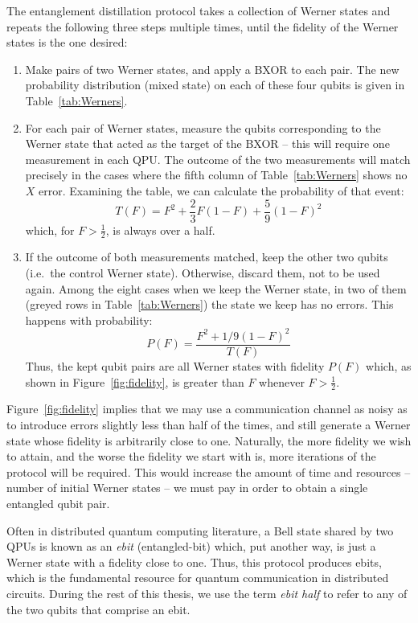 The entanglement distillation protocol takes a collection of Werner states and repeats the following three steps multiple times, until the fidelity of the Werner states is the one desired:

\begin{enumerate}
  \item Make pairs of two Werner states, and apply a BXOR to each pair. The new probability distribution (mixed state) on each of these four qubits is given in Table~\ref{tab:Werners}.

  \item For each pair of Werner states, measure the qubits corresponding to the Werner state that acted as the target of the BXOR -- this will require one measurement in each QPU. The outcome of the two measurements will match precisely in the cases where the fifth column of Table~\ref{tab:Werners} shows no \(X\) error. Examining the table, we can calculate the probability of that event: {\small \[T(F) = F^2 + \frac{2}{3} F(1-F) + \frac{5}{9} (1-F)^2\]}which, for \(F > \frac{1}{2}\), is always over a half.

  \item If the outcome of both measurements matched, keep the other two qubits (i.e.\ the control Werner state). Otherwise, discard them, not to be used again. Among the eight cases when we keep the Werner state, in two of them (greyed rows in Table~\ref{tab:Werners}) the state we keep has no errors. This happens with probability: {\small \[P(F) = \frac{F^2 + 1/9(1-F)^2}{T(F)}\]}Thus, the kept qubit pairs are all Werner states with fidelity \(P(F)\) which, as shown in Figure~\ref{fig:fidelity}, is greater than \(F\) whenever \(F > \frac{1}{2}\).
\end{enumerate}





Figure~\ref{fig:fidelity} implies that we may use a communication channel as noisy as to introduce errors slightly less than half of the times, and still generate a Werner state whose fidelity is arbitrarily close to one. Naturally, the more fidelity we wish to attain, and the worse the fidelity we start with is, more iterations of the protocol will be required. This would increase the amount of time and resources -- number of initial Werner states -- we must pay in order to obtain a single entangled qubit pair.

Often in distributed quantum computing literature, a Bell state shared by two QPUs is known as an \textit{ebit} (entangled-bit) which, put another way, is just a Werner state with a fidelity close to one. Thus, this protocol produces ebits, which is the fundamental resource for quantum communication in distributed circuits. During the rest of this thesis, we use the term \textit{ebit half} to refer to any of the two qubits that comprise an ebit.

